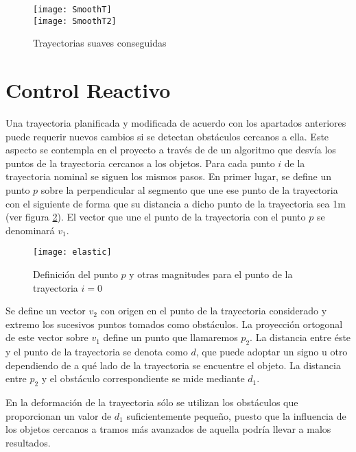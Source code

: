 \begin{figure}[hbt]
  \centering\texttt{[image: SmoothT]}\\
  \vspace{0.2cm}
  \texttt{[image: SmoothT2]}\label{fg:smoothT}
  \caption{Trayectorias suaves conseguidas}
\end{figure}

\section{Control Reactivo}\label{reactivo}

Una trayectoria planificada y modificada de acuerdo con los apartados anteriores puede requerir nuevos cambios si se detectan obstáculos cercanos a ella. Este aspecto se contempla en el proyecto a través de de un algoritmo que desvía los puntos de la trayectoria cercanos a los objetos. Para cada punto $i$ de la trayectoria nominal se siguen los mismos pasos. En primer lugar, se define un punto $p$ sobre la perpendicular al segmento que une ese punto de la trayectoria con el siguiente de forma que su distancia a dicho punto de la trayectoria sea 1m (ver figura \ref{fg:elastic}). El vector que une el punto de la trayectoria con el punto $p$ se denominará $v_{1}$.

\begin{figure}[hbt]
  \centering\texttt{[image: elastic]}\\
  \caption{Definición del punto $p$ y otras magnitudes para el punto de la trayectoria $i = 0$}\label{fg:elastic}
\end{figure}

\pagebreak[4]
Se define un vector $v_{2}$ con origen en el punto de la trayectoria considerado y extremo los sucesivos puntos tomados como obstáculos. La proyección ortogonal de este vector sobre $v_{1}$ define un punto que llamaremos $p_{2}$. La distancia entre éste y el punto de la trayectoria se denota como $d$, que puede adoptar un signo u otro dependiendo de a qué lado de la trayectoria se encuentre el objeto. La distancia entre $p_{2}$ y el obstáculo correspondiente se mide mediante $d_{1}$.

En la deformación de la trayectoria sólo se utilizan los obstáculos que proporcionan un valor de $d_{1}$ suficientemente pequeño, puesto que la influencia de los objetos cercanos a tramos más avanzados de aquella podría llevar a malos resultados.

